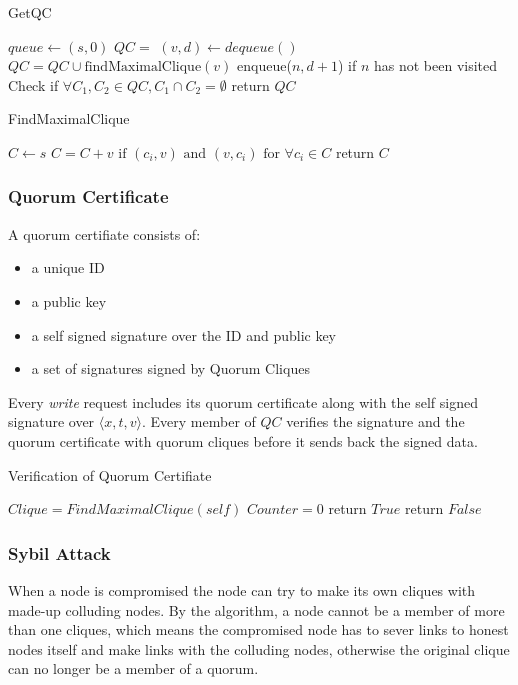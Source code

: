\documentclass[twoside,twocolumn,10pt,fleqn]{article}
\begin{document}
\begin{algorithm}
  \caption{GetQC}
  \SetAlgoNoLine
  $queue \leftarrow {(s, 0)}$\;
  $QC = {}$\;
  {
    $(v, d) \leftarrow dequeue()$\;
    $QC = QC \cup \text{findMaximalClique}(v)$\;
    {
      enqueue($n, d + 1$) if $n$ has not been visited\;
    }
  }
  Check if $\forall C_1, C_2 \in QC, C_1 \cap C_2 = \emptyset$\;
  return $QC$
\end{algorithm}

\begin{algorithm}
  \caption{FindMaximalClique}
  \SetAlgoNoLine
  $C \leftarrow {s}$\;
  {
    $C = C + {v} \text{ if } (c_i, v) \text{ and } (v, c_i)
    \text{ for } \forall c_i \in C$\;
  }
  return $C$
\end{algorithm}

\subsubsection*{Quorum Certificate}
A quorum certifiate consists of:
\begin{itemize}
\item a unique ID
\item a public key
\item a self signed signature over the ID and public key
\item a set of signatures signed by Quorum Cliques
\end{itemize}

Every {\em write} request includes its quorum certificate along with the
self signed signature over $\langle x, t, v \rangle$. Every member of
$QC$ verifies the signature and the quorum certificate with quorum
cliques before it sends back the signed data.

\begin{algorithm}
  \caption{Verification of Quorum Certifiate}
  \SetAlgoNoLine
  $Clique = FindMaximalClique(self)$\;
  $Counter = 0$\;
  {
  }
  {
    return $True$\;
  }{
    return $False$\;
  }
\end{algorithm}

\subsubsection*{Sybil Attack}
When a node is compromised the node can try to make its own cliques
with made-up colluding nodes. By the algorithm, a node cannot be a
member of more than one cliques, which means the compromised node has
to sever links to honest nodes itself and make links with the
colluding nodes, otherwise the original clique can no longer
be a member of a quorum.
\end{document}
